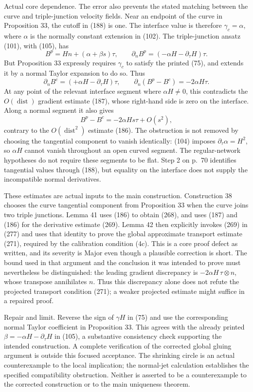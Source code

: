 \documentclass[10pt]{article}
\begin{document}
Actual core dependence. The error also prevents the stated matching between the curve and triple-junction velocity fields. Near an endpoint of the curve in Proposition 33, the cutoff in (188) is one. The interface value is therefore \(\gamma_c=\alpha\), where \(\alpha\) is the normally constant extension in (102). The triple-junction ansatz (101), with (105), has \[B^p=Hn+(\alpha+\beta s)\tau,\qquad
 \partial_n B^p=(-\alpha H-\partial_\tau H)\tau .\] But Proposition 33 expressly requires \(\gamma_c\) to satisfy the printed (75), and extends it by a normal Taylor expansion to do so. Thus \[\partial_n B^c=(+\alpha H-\partial_\tau H)\tau,\qquad
 \partial_n(B^p-B^c)=-2\alpha H\tau.                         \tag{2.6}\] At any point of the relevant interface segment where \(\alpha H\ne0\), this contradicts the \(O(\operatorname{dist})\) gradient estimate (187), whose right-hand side is zero on the interface. Along a normal segment it also gives \[B^p-B^c=-2\alpha Hs\tau+O(s^2),\] contrary to the \(O(\operatorname{dist}^2)\) estimate (186). The obstruction is not removed by choosing the tangential component to vanish identically: (104) imposes \(\partial_\tau\alpha=H^2\), so \(\alpha H\) cannot vanish throughout an open curved segment. The regular-network hypotheses do not require these segments to be flat. Step 2 on p. 70 identifies tangential values through (188), but equality on the interface does not supply the incompatible normal derivatives.\par
These estimates are actual inputs to the main construction. Construction 38 chooses the curve tangential component from Proposition 33 when the curve joins two triple junctions. Lemma 41 uses (186) to obtain (268), and uses (187) and (186) for the derivative estimate (269). Lemma 42 then explicitly invokes (269) in (277) and uses that identity to prove the global approximate transport estimate (271), required by the calibration condition (4c). This is a core proof defect as written, and its severity is Major even though a plausible correction is short. The bound used in that argument and the conclusion it was intended to prove must nevertheless be distinguished: the leading gradient discrepancy is \(-2\alpha H\,\tau\otimes n\), whose transpose annihilates \(n\). Thus this discrepancy alone does not refute the projected transport condition (271); a weaker projected estimate might suffice in a repaired proof.\par
Repair and limit. Reverse the sign of \(\gamma H\) in (75) and use the corresponding normal Taylor coefficient in Proposition 33. This agrees with the already printed \(\beta=-\alpha H-\partial_\tau H\) in (105), a substantive consistency check supporting the intended construction. A complete verification of the corrected global gluing argument is outside this focused acceptance. The shrinking circle is an actual counterexample to the local implication; the normal-jet calculation establishes the specified compatibility obstruction. Neither is asserted to be a counterexample to the corrected construction or to the main uniqueness theorem.\par
\end{document}

